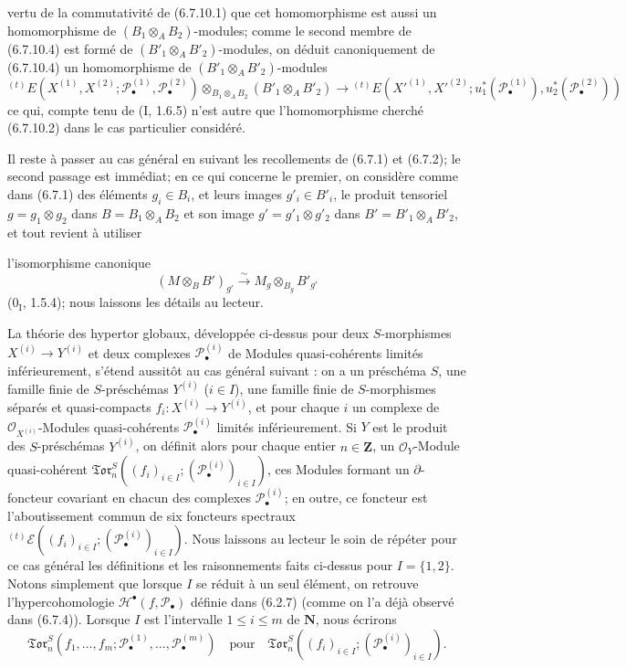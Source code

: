\begin{env}[6.7.10]
vertu de la commutativité de (6.7.10.1) que cet homomorphisme est aussi un
homomorphisme de $(B_1\otimes_A B_2)$-modules; comme le second membre de
(6.7.10.4) est formé de $(B'_1\otimes_A B'_2)$-modules, on déduit
canoniquement de (6.7.10.4) un homomorphisme de
$(B'_1\otimes_A B'_2)$-modules
\[
  {}^{(t)}E
  (X^{(1)},X^{(2)};\mathscr P_\bullet^{(1)},\mathscr P_\bullet^{(2)})
  \otimes_{B_1\otimes_A B_2}(B'_1\otimes_A B'_2)
  \longrightarrow
  {}^{(t)}E
  (X'^{(1)},X'^{(2)};
   u_1^*(\mathscr P_\bullet^{(1)}),u_2^*(\mathscr P_\bullet^{(2)}))
  \tag{6.7.10.5}\label{III.6.7.10.5.fr}
\]
ce qui, compte tenu de (I, 1.6.5) n'est autre que l'homomorphisme cherché
(6.7.10.2) dans le cas particulier considéré.

Il reste à passer au cas général en suivant les recollements de (6.7.1) et
(6.7.2); le second passage est immédiat; en ce qui concerne le premier, on
considère comme dans (6.7.1) des éléments $g_i\in B_i$, et leurs images
$g'_i\in B'_i$, le produit tensoriel $g=g_1\otimes g_2$ dans
$B=B_1\otimes_A B_2$ et son image $g'=g'_1\otimes g'_2$ dans
$B'=B'_1\otimes_A B'_2$, et tout revient à utiliser

l'isomorphisme canonique
\[
  (M\otimes_B B')_{g'}
  \xrightarrow{\sim}
  M_g\otimes_{B_g}B'_{g'}
\]
($0_{\mathrm I}$, 1.5.4); nous laissons les détails au lecteur.
\end{env}

\begin{env}[6.7.11]
La théorie des hypertor globaux, développée ci-dessus pour deux
$S$-morphismes $X^{(i)}\to Y^{(i)}$ et deux complexes
$\mathscr P_\bullet^{(i)}$ de Modules quasi-cohérents limités inférieurement,
s'étend aussitôt au cas général suivant : on a un préschéma $S$, une famille
finie de $S$-préschémas $Y^{(i)}$ ($i\in I$), une famille finie de
$S$-morphismes séparés et quasi-compacts
$f_i:X^{(i)}\to Y^{(i)}$, et pour chaque $i$ un complexe de
$\mathscr O_{X^{(i)}}$-Modules quasi-cohérents
$\mathscr P_\bullet^{(i)}$ limités inférieurement. Si $Y$ est le produit des
$S$-préschémas $Y^{(i)}$, on définit alors pour chaque entier
$n\in\mathbf Z$, un $\mathscr O_Y$-Module quasi-cohérent
$\mathfrak{Tor}_n^S((f_i)_{i\in I};
(\mathscr P_\bullet^{(i)})_{i\in I})$,
ces Modules formant un $\partial$-foncteur covariant en chacun des complexes
$\mathscr P_\bullet^{(i)}$; en outre, ce foncteur est l'aboutissement commun
de six foncteurs spectraux
${}^{(t)}\mathscr E((f_i)_{i\in I};(\mathscr P_\bullet^{(i)})_{i\in I})$.
Nous laissons au lecteur le soin de répéter pour ce cas général les
définitions et les raisonnements faits ci-dessus pour $I=\{1,2\}$. Notons
simplement que lorsque $I$ se réduit à un seul élément, on retrouve
l'hypercohomologie $\mathscr H^\bullet(f,\mathscr P_\bullet)$ définie dans
(6.2.7) (comme on l'a déjà observé dans (6.7.4)). Lorsque $I$ est l'intervalle
$1\leq i\leq m$ de $\mathbf N$, nous écrirons
\[
  \mathfrak{Tor}_n^S
  (f_1,\ldots,f_m;
   \mathscr P_\bullet^{(1)},\ldots,\mathscr P_\bullet^{(m)})
  \quad\text{pour}\quad
  \mathfrak{Tor}_n^S
  ((f_i)_{i\in I};(\mathscr P_\bullet^{(i)})_{i\in I}).
\]
\end{env}

